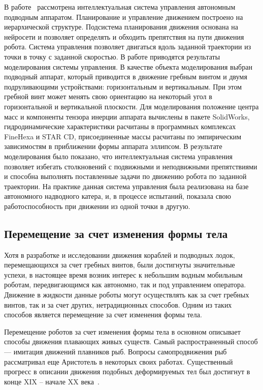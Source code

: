 В работе~\cite{Pshihopov_2014} рассмотрена интеллектуальная система управления автономным подводным аппаратом. Планирование и управление движением построено на иерархической структуре. Подсистема планирования движения основана на нейросети и позволяет определять и обходить препятствия на пути движения робота. Система управления позволяет двигаться вдоль заданной траектории из точки в точку с заданной скоростью. В работе приводятся результаты моделирования системы управления. В качестве объекта моделирования выбран подводный аппарат, который приводится в движение гребным винтом и двумя подруливающими устройствами: горизонтальным и вертикальным. При этом гребной винт может менять свою ориентацию на некоторый угол в горизонтальной и вертикальной плоскости. Для моделирования положение центра масс и компоненты тензора инерции аппарата вычислены в пакете SolidWorks, гидродинамические характеристики расчитаны в программных комплексах FineHexa и STAR CD, присоединенные массы расчитаны по эмпирическим зависимостям в приближении формы аппарата эллипсом. В результате моделирования было показано, что интеллектуальная система управления позволяет избегать столкновений с подвижными и неподвижными препятствиями и способна выполнять поставленные задачи по движению робота по заданной траектории. На практике данная система управления была реализована на базе автономного надводного катера, и, в процессе испытаний, показала свою работоспособность при движении из одной точки в другую.



\subsection{Перемещение за счет изменения формы тела}\label{sec:ch1/sec3}

Хотя в разработке и исследовании движения кораблей и подводных лодок, перемещающихся за счет гребных винтов, были достигнуты значительные успехи, в настоящее время возник интерес к небольшим водным мобильным роботам, передвигающимся как автономно, так и под управлением оператора. Движение в жидкости данные роботы могут осуществлять как за счет гребных винтов, так и за счет других, нетрадиционных способов. Одним из таких способов является перемещение за счет изменения формы тела.

Перемещение роботов за счет изменения формы тела в основном описывает способы движения плавающих живых существ. Самый распространенный способ --- имитация движений плавников рыб. Вопросы самопродвижения рыб рассматривал еще Аристотель в некоторых своих работах. Существенный прогресс в описании движения подобных деформируемых тел был достигнут в конце XIX -- начале XX века~\cite{Alexander_1983}. 

